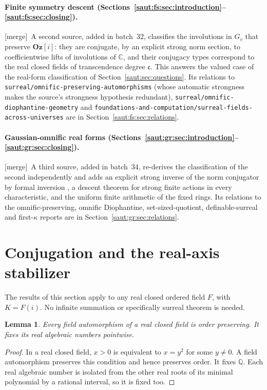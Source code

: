 \documentclass[11pt]{article}
\newtheorem{lemma}[theorem]{Lemma}
\theoremstyle{definition}
\theoremstyle{remark}
\newcommand{\C}{\mathbb C}
\newcommand{\Q}{\mathbb Q}
\newcommand{\repo}[1]{\nolinkurl{#1}}%
\newcommand{\Oz}{\mathbf{Oz}}
\newcommand{\cc}{\mathfrak c}
\newcommand{\mergetag}{\textup{[merge]}}
\numberwithin{equation}{section}
\begin{document}
\paragraph{Finite symmetry descent (Sections~\ref{saut:fs:sec:introduction}--\ref{saut:fs:sec:closing}).}
\mergetag\ A second source, added in batch~32, classifies the involutions in
$G_v$ that preserve $\Oz[i]$: they are conjugate, by an explicit strong norm
section, to coefficientwise lifts of involutions of $\C$, and their conjugacy types
correspond to the real closed fields of transcendence degree $\cc$. This answers the
valued case of the real-form classification of Section~\ref{saut:sec:questions}. Its
relations to \repo{surreal/omnific-preserving-automorphisms} (whose automatic
strongness makes the source's strongness hypothesis redundant),
\repo{surreal/omnific-diophantine-geometry} and
\repo{foundations-and-computation/surreal-fields-across-universes} are in
Section~\ref{saut:fs:sec:relations}.

\paragraph{Gaussian-omnific real forms (Sections~\ref{saut:gr:sec:introduction}--\ref{saut:gr:sec:closing}).}
\mergetag\ A third source, added in batch~34, re-derives the classification of the
second independently and adds an explicit strong inverse of the norm conjugator by
formal inversion \cite{BKKS}, a descent theorem for strong finite actions in every
characteristic, and the uniform finite arithmetic of the fixed rings. Its relations to
the omnific-preserving, omnific Diophantine, set-sized-quotient, definable-surreal and
first-$\kappa$ reports are in Section~\ref{saut:gr:sec:relations}.

\section{Conjugation and the real-axis stabilizer}\label{saut:sec:axis}

The results of this section apply to any real closed ordered field $F$,
with $K=F(i)$. No infinite summation or specifically surreal theorem is needed.

\begin{lemma}\label{saut:lem:order}
Every field automorphism of a real closed field is order preserving. It fixes
its real algebraic numbers pointwise.
\end{lemma}
\begin{proof}
In a real closed field, $x>0$ is equivalent to $x=y^2$ for some $y\ne0$.
A field automorphism preserves this condition and hence preserves order.
It fixes $\Q$. Each real algebraic number is isolated from the other real
roots of its minimal polynomial by a rational interval, so it is fixed too.
\end{proof}
\end{document}
